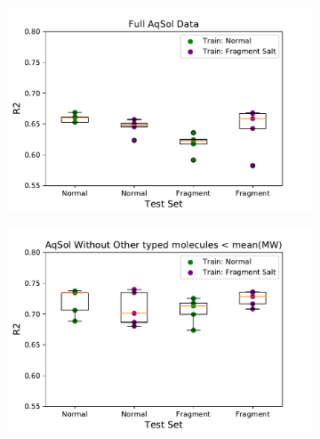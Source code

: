 \documentclass[journal=jcisd8,manuscript=article]{achemso}
\begin{document}
\begin{figure}[tb]
    \centering
    \begin{subfigure}[t]{0.48\textwidth}
        \centering
        \includegraphics[width=\linewidth]{figures/full_saltfragfirst_R2s_boxplots.pdf}
    \end{subfigure}%
    \hfill
    \begin{subfigure}[t]{0.48\textwidth}
        \centering
        \includegraphics[width=\linewidth]{figures/othersMW_saltfragfirst_R2s_boxplots.pdf}
    \end{subfigure}
    

\end{figure}
\end{document}
